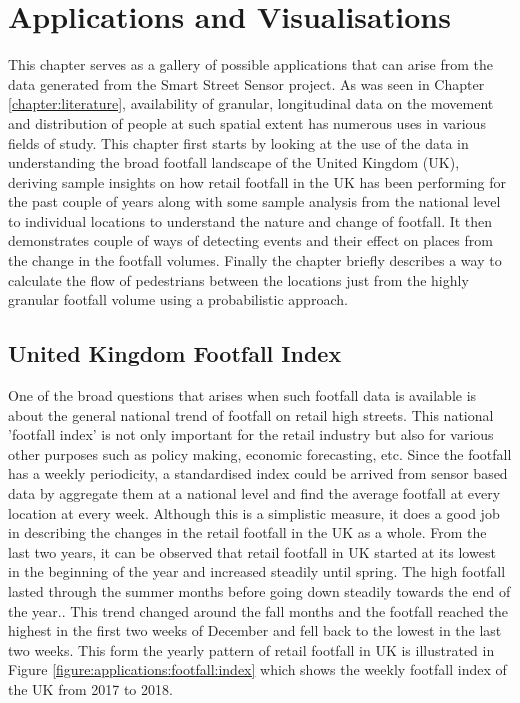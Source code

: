 \chapter{Applications and Visualisations} \label{chapter:applications}
This chapter serves as a gallery of possible applications that can arise from the data generated from the Smart Street Sensor project. 
As was  seen in Chapter \ref{chapter:literature}, availability of granular, longitudinal data on the movement and distribution of people at such spatial extent has numerous uses in various fields of study. 
This chapter first starts by looking at the use of the data in understanding the broad footfall landscape of the United Kingdom (UK), deriving sample insights on how retail footfall in the UK has been performing for the past couple of years along with some sample analysis from the national level to individual locations to understand the nature and change of footfall.
It then demonstrates couple of ways of detecting events and their effect on places from the change in the footfall volumes.
Finally the chapter briefly describes a way to calculate the flow of pedestrians between the locations just from the highly granular footfall volume using a probabilistic approach.

\section{United Kingdom Footfall Index}
One of the broad questions that arises when such footfall data is available is about the general national trend of footfall on retail high streets.
This national 'footfall index' is not only important for the retail industry but also for various other purposes such as policy making, economic forecasting, etc.
Since the footfall has a weekly periodicity, a standardised index could be arrived from sensor based data by aggregate them at a national level and find the average footfall at every location at every week. 
Although this is a simplistic measure, it does a good job in describing the changes in the retail footfall in the UK as a whole.
From the last two years, it can be observed that retail footfall in UK started at its lowest in the beginning of the year and increased steadily until spring.
The high footfall lasted through the summer months before going down steadily towards the end of the year..
This trend changed around the fall months and the footfall reached the highest in the first two weeks of December and fell back to the lowest in the last two weeks.
This form the yearly pattern of retail footfall in UK is illustrated in Figure \ref{figure:applications:footfall:index} which shows the weekly footfall index of the UK from 2017 to 2018. 

